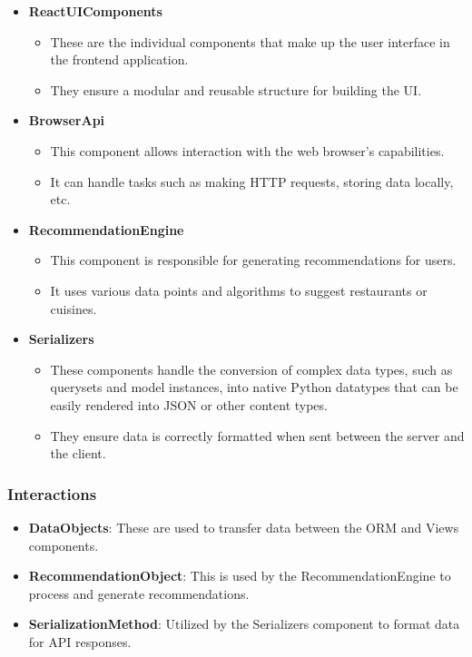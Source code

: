 \documentclass[12pt, a4paper, oneside]{article}
\begin{document}
\begin{itemize}
    \item \textbf{ReactUIComponents}
    \begin{itemize}
        \item These are the individual components that make up the user interface in the frontend application.
        \item They ensure a modular and reusable structure for building the UI.
    \end{itemize}

    \item \textbf{BrowserApi}
    \begin{itemize}
        \item This component allows interaction with the web browser's capabilities.
        \item It can handle tasks such as making HTTP requests, storing data locally, etc.
    \end{itemize}

    \item \textbf{RecommendationEngine}
    \begin{itemize}
        \item This component is responsible for generating recommendations for users.
        \item It uses various data points and algorithms to suggest restaurants or cuisines.
    \end{itemize}

    \item \textbf{Serializers}
    \begin{itemize}
        \item These components handle the conversion of complex data types, such as querysets and model instances, into native Python datatypes that can be easily rendered into JSON or other content types.
        \item They ensure data is correctly formatted when sent between the server and the client.
    \end{itemize}
\end{itemize}

\subsubsection*{Interactions}
\begin{itemize}
    \item \textbf{DataObjects}: These are used to transfer data between the ORM and Views components.
    \item \textbf{RecommendationObject}: This is used by the RecommendationEngine to process and generate recommendations.
    \item \textbf{SerializationMethod}: Utilized by the Serializers component to format data for API responses.
\end{itemize}
\end{document}
